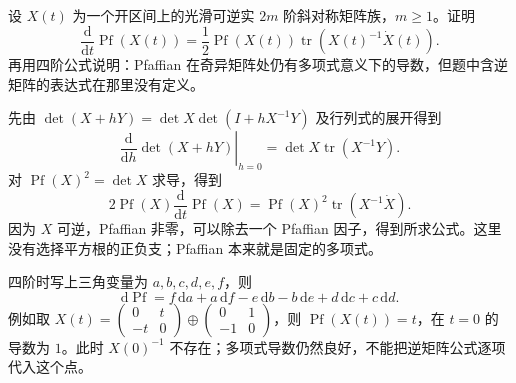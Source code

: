\BookExercises
\begin{exercise}\label{g3:ex:pfaffian-variation}
	设 \(X(t)\) 为一个开区间上的光滑可逆实 \(2m\) 阶斜对称矩阵族，\(m\ge1\)。证明
	\[
		\frac{\mathrm d}{\mathrm dt}\operatorname{Pf}(X(t))
		=\frac12\operatorname{Pf}(X(t))\operatorname{tr}(X(t)^{-1}\dot X(t)).
	\]
	再用四阶公式说明：Pfaffian 在奇异矩阵处仍有多项式意义下的导数，但题中含逆矩阵的表达式在那里没有定义。
\end{exercise}
\begin{solution}
	先由 \(\det(X+hY)=\det X\det(I+hX^{-1}Y)\) 及行列式的展开得到
	\[
		\left.\frac{\mathrm d}{\mathrm dh}\det(X+hY)\right|_{h=0}
		=\det X\operatorname{tr}(X^{-1}Y).
	\]
	对 \(\operatorname{Pf}(X)^2=\det X\) 求导，得到
	\[
		2\operatorname{Pf}(X)\frac{\mathrm d}{\mathrm dt}\operatorname{Pf}(X)
		=\operatorname{Pf}(X)^2\operatorname{tr}(X^{-1}\dot X).
	\]
	因为 \(X\) 可逆，Pfaffian 非零，可以除去一个 Pfaffian 因子，得到所求公式。这里没有选择平方根的正负支；Pfaffian 本来就是固定的多项式。

	四阶时写上三角变量为 \(a,b,c,d,e,f\)，则
	\[
		\mathrm d\operatorname{Pf}
		=f\,\mathrm da+a\,\mathrm df-e\,\mathrm db-b\,\mathrm de+d\,\mathrm dc+c\,\mathrm dd.
	\]
	例如取 \(X(t)=\left(\begin{smallmatrix}0&t\\-t&0\end{smallmatrix}\right)\oplus\left(\begin{smallmatrix}0&1\\-1&0\end{smallmatrix}\right)\)，则 \(\operatorname{Pf}(X(t))=t\)，在 \(t=0\) 的导数为 \(1\)。此时 \(X(0)^{-1}\) 不存在；多项式导数仍然良好，不能把逆矩阵公式逐项代入这个点。
\end{solution}

